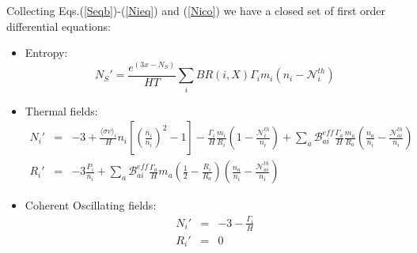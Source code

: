 \documentclass[preprint,notoc]{JHEP3}
\def\bi{\begin{itemize}}
\def\ei{\end{itemize}}
\def\be{\begin{equation}}
\def\ee{\end{equation}}
\def\bea{\begin{eqnarray}}
\def\eea{\end{eqnarray}}
\def\sigv{\langle \sigma v \rangle}
\begin{document}
Collecting Eqs.(\ref{Seqb})-(\ref{Nieq}) and (\ref{Nico}) we have a closed set of first order differential equations:
\bi
\item Entropy:
\be
N_S' = \frac{e^{(3 x - N_S)}}{HT} \sum_{i} BR(i,X) \Gamma_i m_i \left(n_i -
\mathcal{N}_{i}^{th} \right) \label{eq:Sfin}
\ee
\item Thermal fields:
\bea
N_i'& = & -3 + \frac{\sigv_i}{H} n_i [\left(\frac{\bar{n}_i}{n_i}\right)^2
-1] -  \frac{\Gamma_i}{H} \frac{m_i}{R_i}\left(1 - \frac{\mathcal{N}_{i}^{th}}{n_i}
 \right)
  +  \sum_{a} \mathcal{B}_{ai}^{eff} \frac{\Gamma_a}{H}
 \frac{m_a}{R_a}\left(\frac{n_a}{n_i} - \frac{\mathcal{N}_{ai}^{th}}{n_i}
  \right) \nonumber
 \\
R_i' & = &  -3 \frac{P_i}{n_i} + \sum_{a} \mathcal{B}_{ai}^{eff}
\frac{\Gamma_a}{H} m_a \left( \frac{1}{2} - \frac{R_i}{R_a} \right) \left(\frac{n_a}{n_i} -
\frac{\mathcal{N}_{ai}^{th}}{n_i} \right)
\eea
\item Coherent Oscillating fields:
\bea
N_i' & = & -3 - \frac{\Gamma_i}{H} \nonumber \\
R_i' & = & 0 \label{eq:COeq}
\eea
\ei
\end{document}
